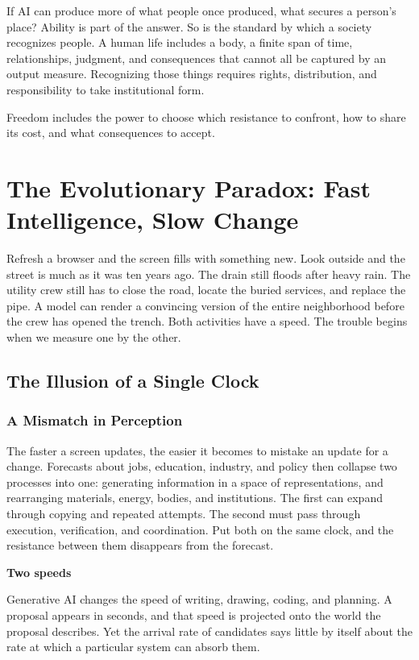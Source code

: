 \documentclass[11pt,openany]{book}
\newcommand{\subhead}[1]{\par\medskip\noindent\textbf{#1}\par\nobreak\smallskip}
\begin{document}
If AI can produce more of what people once produced, what secures a person's place? Ability is part of the answer. So is the standard by which a society recognizes people. A human life includes a body, a finite span of time, relationships, judgment, and consequences that cannot all be captured by an output measure. Recognizing those things requires rights, distribution, and responsibility to take institutional form.

Freedom includes the power to choose which resistance to confront, how to share its cost, and what consequences to accept.

\tableofcontents
\mainmatter
\chapter{The Evolutionary Paradox: Fast Intelligence, Slow Change}

Refresh a browser and the screen fills with something new. Look outside and the street is much as it was ten years ago. The drain still floods after heavy rain. The utility crew still has to close the road, locate the buried services, and replace the pipe. A model can render a convincing version of the entire neighborhood before the crew has opened the trench. Both activities have a speed. The trouble begins when we measure one by the other.

\section{The Illusion of a Single Clock}

\subsection{A Mismatch in Perception}

The faster a screen updates, the easier it becomes to mistake an update for a change. Forecasts about jobs, education, industry, and policy then collapse two processes into one: generating information in a space of representations, and rearranging materials, energy, bodies, and institutions. The first can expand through copying and repeated attempts. The second must pass through execution, verification, and coordination. Put both on the same clock, and the resistance between them disappears from the forecast.

\subhead{Two speeds}

Generative AI changes the speed of writing, drawing, coding, and planning. A proposal appears in seconds, and that speed is projected onto the world the proposal describes. Yet the arrival rate of candidates says little by itself about the rate at which a particular system can absorb them.
\end{document}

